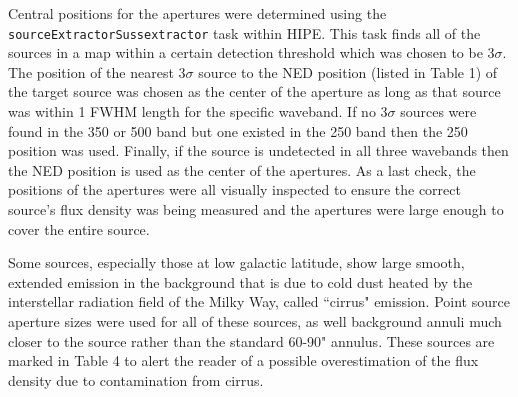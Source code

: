 Central positions for the apertures were determined using the \texttt{sourceExtractorSussextractor} task within HIPE. This task finds all of the sources in a map within a certain detection threshold which was chosen to be $3\sigma$. The position of the nearest $3\sigma$ source to the NED position (listed in Table 1) of the target source was chosen as the center of the aperture as long as that source was within 1 FWHM length for the specific waveband. If no $3\sigma$ sources were found in the 350 or 500 \um{} band but one existed in the 250 \um{} band then the 250 \um{} position was used. Finally, if the source is undetected in all three wavebands then the NED position is used as the center of the apertures. As a last check, the positions of the apertures were all visually inspected to ensure the correct source's flux density was being measured and the apertures were large enough to cover the entire source.

Some sources, especially those at low galactic latitude, show large smooth, extended emission in the background that is due to cold dust heated by the interstellar radiation field of the Milky Way, called ``cirrus" emission. Point source aperture sizes were used for all of these sources, as well background annuli much closer to the source rather than the standard 60-90" annulus. These sources are marked in Table 4 to alert the reader of a possible overestimation of the flux density due to contamination from cirrus.



